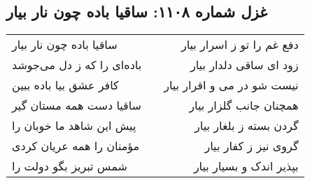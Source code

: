 \begin{center}
\section*{غزل شماره ۱۱۰۸: ساقیا باده چون نار بیار}
\label{sec:1108}
\begin{longtable}{l p{0.5cm} r}
ساقیا باده چون نار بیار
&&
دفع غم را تو ز اسرار بیار
\\
باده‌ای را که ز دل می‌جوشد
&&
زود ای ساقی دلدار بیار
\\
کافر عشق بیا باده ببین
&&
نیست شو در می و اقرار بیار
\\
ساقیا دست همه مستان گیر
&&
همچنان جانب گلزار بیار
\\
پیش این شاهد ما خوبان را
&&
گردن بسته ز بلغار بیار
\\
مؤمنان را همه عریان کردی
&&
گروی نیز ز کفار بیار
\\
شمس تبریز بگو دولت را
&&
بپذیر اندک و بسیار بیار
\\
\end{longtable}
\end{center}
